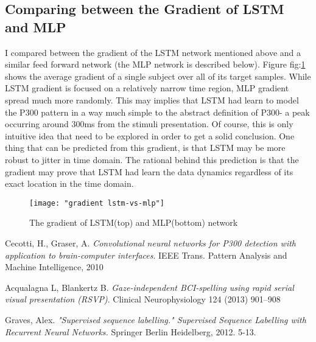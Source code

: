 \documentclass[]{report}
\begin{document}
\subsection{Comparing between the Gradient of LSTM and MLP}
I compared between the gradient of the LSTM network mentioned above and a similar feed forward network (the MLP network is described below). Figure fig:\ref{fig:gradient_mlp_vs_lstm} shows the average gradient of a single subject over all of its target samples. While LSTM gradient is focused on a relatively narrow time region, MLP gradient spread much more randomly. This may implies that LSTM had learn to model the P300 pattern in a way much simple to the abstract definition of P300- a peak occurring around 300ms from the stimuli presentation. Of course, this is only intuitive idea that need to be explored in order to get a solid conclusion. One thing that can be predicted from this gradient, is that LSTM may be more robust to jitter in time domain. The rational behind this prediction is that the gradient may prove that LSTM had learn the data dynamics regardless of its exact location in the time domain.




\begin{figure}
	\texttt{[image: "gradient lstm-vs-mlp"]}
	\caption{The gradient of LSTM(top) and MLP(bottom) network}
	\label{fig:gradient_mlp_vs_lstm}
\end{figure}













\begin{thebibliography}{9}
	
	Cecotti, H., Graser, A.	
	\textit{Convolutional neural networks for P300 detection with application to brain-computer interfaces}. 
	IEEE Trans. Pattern Analysis and Machine Intelligence, 2010
	
	Acqualagna L, Blankertz B.
	\textit{Gaze-independent BCI-spelling using rapid serial visual presentation (RSVP)}. 
	Clinical Neurophysiology 124 (2013) 901–908
	
	Graves, Alex.
	\textit{"Supervised sequence labelling." Supervised Sequence Labelling with Recurrent Neural Networks.} Springer Berlin Heidelberg, 2012. 5-13.
	
\end{thebibliography}
\end{document}
